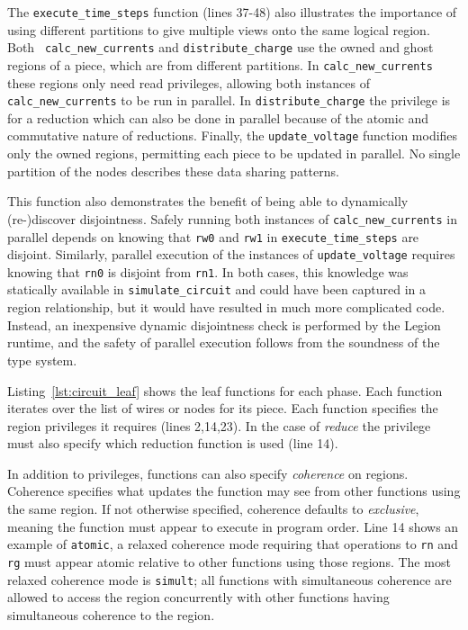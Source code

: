 The {\tt execute\_time\_steps} function (lines 37-48)  
also illustrates the importance of using different partitions to give
multiple views onto the same logical region.  Both {\tt
  calc\_new\_currents} and {\tt distribute\_charge} 
use the owned and ghost regions of a piece, which are from different partitions. In
{\tt calc\_new\_currents} these regions only need read
privileges, allowing both instances of {\tt calc\_new\_currents} to be
run in parallel.  In {\tt distribute\_charge} the
privilege is for a reduction which can also be done in parallel
because of the atomic and commutative nature of reductions.  Finally,
the {\tt update\_voltage} function modifies only the owned regions, permitting
each piece to be updated in parallel.  No
single partition of the nodes
describes these data sharing patterns.

This function also demonstrates the benefit of being able to dynamically
(re-)discover disjointness.  Safely running both instances of 
{\tt calc\_new\_currents} in parallel depends on knowing that {\tt rw0} and
{\tt rw1} in {\tt execute\_time\_steps} are disjoint.  Similarly, parallel
execution of the instances of {\tt update\_voltage} requires knowing that
{\tt rn0} is disjoint from {\tt rn1}.  In both cases, this knowledge was
statically available in {\tt simulate\_circuit} and could have been captured
in a region relationship, but it would have resulted in much more complicated
code.
Instead, an inexpensive dynamic disjointness check is performed by the Legion
runtime, and the safety of parallel execution follows from the soundness of
the type system.

Listing~\ref{lst:circuit_leaf} shows the leaf functions for each phase.
Each function iterates over the list of wires or
nodes for its piece.  Each function specifies the region privileges it
requires (lines 2,14,23).  
In the case of {\em reduce} the
privilege must also specify which reduction function is used
(line 14).

In addition to privileges, functions can also specify {\em coherence}
on regions.  Coherence specifies what updates the function may
see from other functions using the same region.  If not otherwise
specified, coherence defaults to {\em exclusive}, meaning the
function must appear to execute in program order.  Line 14 shows
an example of {\tt atomic}, a relaxed coherence mode requiring
that operations to {\tt rn} and {\tt rg} must appear atomic relative
to other functions using those regions.  The most relaxed coherence
mode is {\tt simult}; all functions with 
simultaneous coherence are allowed to access the region concurrently
with other functions having simultaneous coherence to the region.

